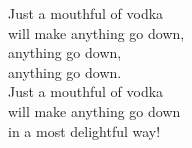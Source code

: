 
            Just a mouthful of vodka \\
            will make anything go down, \\
            anything go down, \\
            anything go down. \\
            Just a mouthful of vodka \\
            will make anything go down \\
            in a most delightful way! \\
